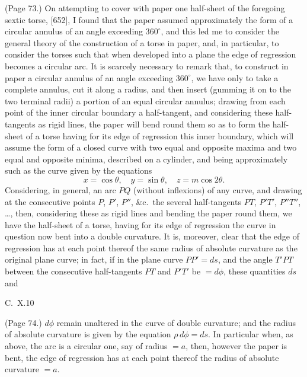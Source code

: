 \documentclass[11pt,a4paper]{article}
\begin{document}
\medskip

\noindent (Page 73.) On attempting to cover with paper one half-sheet of the foregoing sextic torse, [652], I found that the paper assumed approximately the form of a circular annulus of an angle exceeding $360^\circ$, and this led me to consider the general theory of the construction of a torse in paper, and, in particular, to consider the torses such that when developed into a plane the edge of regression becomes a circular arc. It is scarcely necessary to remark that, to construct in paper a circular annulus of an angle exceeding $360^\circ$, we have only to take a complete annulus, cut it along a radius, and then insert (gumming it on to the two terminal radii) a portion of an equal circular annulus; drawing from each point of the inner circular boundary a half-tangent, and considering these half-tangents as rigid lines, the paper will bend round them so as to form the half-sheet of a torse having for its edge of regression this inner boundary, which will assume the form of a closed curve with two equal and opposite maxima and two equal and opposite minima, described on a cylinder, and being approximately such as the curve given by the equations
\[
x = \cos\theta,\quad y = \sin\theta,\quad z = m\cos 2\theta.
\]
Considering, in general, an arc $PQ$ (without inflexions) of any curve, and drawing at the consecutive points $P$, $P'$, $P''$, \&c.\ the several half-tangents $PT$, $P'T'$, $P''T''$, \ldots, then, considering these as rigid lines and bending the paper round them, we have the half-sheet of a torse, having for its edge of regression the curve in question now bent into a double curvature. It is, moreover, clear that the edge of regression has at each point thereof the same radius of absolute curvature as the original plane curve; in fact, if in the plane curve $PP' = ds$, and the angle $T'PT$ between the consecutive half-tangents $PT$ and $P'T'$ be $= d\phi$, these quantities $ds$ and

\hfill C.\ X.\hfill 10

\bigskip

\noindent (Page 74.) $d\phi$ remain unaltered in the curve of double curvature; and the radius of absolute curvature is given by the equation $\rho\, d\phi = ds$. In particular when, as above, the arc is a circular one, say of radius $= a$, then, however the paper is bent, the edge of regression has at each point thereof the radius of absolute curvature $= a$.
\end{document}
